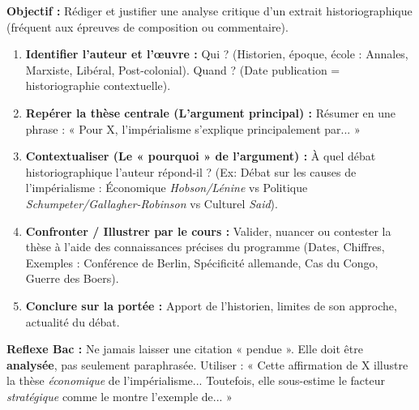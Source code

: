 \documentclass[11pt]{article}
\begin{document}
\begin{methode}
\textbf{Objectif :} Rédiger et justifier une analyse critique d'un extrait historiographique (fréquent aux épreuves de composition ou commentaire).
\begin{enumerate}
    \item \textbf{Identifier l'auteur et l'œuvre :} Qui ? (Historien, époque, école : Annales, Marxiste, Libéral, Post-colonial). Quand ? (Date publication = historiographie contextuelle).
    \item \textbf{Repérer la thèse centrale (L'argument principal) :} Résumer en une phrase : « Pour X, l'impérialisme s'explique principalement par... »
    \item \textbf{Contextualiser (Le « pourquoi » de l'argument) :} À quel débat historiographique l'auteur répond-il ? (Ex: Débat sur les causes de l'impérialisme : Économique \emph{Hobson/Lénine} vs Politique \emph{Schumpeter/Gallagher-Robinson} vs Culturel \emph{Said}).
    \item \textbf{Confronter / Illustrer par le cours :} Valider, nuancer ou contester la thèse à l'aide des connaissances précises du programme (Dates, Chiffres, Exemples : Conférence de Berlin, Spécificité allemande, Cas du Congo, Guerre des Boers).
    \item \textbf{Conclure sur la portée :} Apport de l'historien, limites de son approche, actualité du débat.
\end{enumerate}
\textbf{Reflexe Bac :} Ne jamais laisser une citation « pendue ». Elle doit être \textbf{analysée}, pas seulement paraphrasée. Utiliser : « Cette affirmation de X illustre la thèse \emph{économique} de l'impérialisme... Toutefois, elle sous-estime le facteur \emph{stratégique} comme le montre l'exemple de... »
\end{methode}
\end{document}
